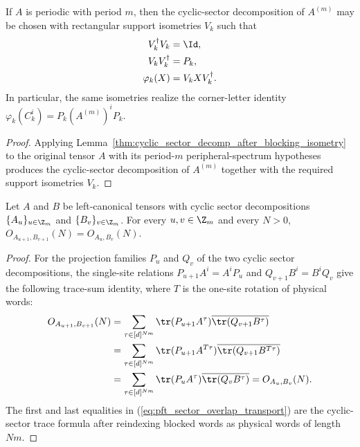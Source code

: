 \begin{lemma}
    \label{thm:cyclic_sector_compression_letter_isometry_periodic}
    \leanok
    If $A$ is periodic with period $m$, then the cyclic-sector decomposition of
    $A^{(m)}$ may be chosen with rectangular support isometries $V_k$ such that
    \begin{align}
        V_k^\dagger V_k & =\Id, \notag             \\
        V_kV_k^\dagger  & =P_k, \notag             \\
        \varphi_k(X)    & =V_kXV_k^\dagger. \notag
    \end{align}
    In particular, the same isometries realize the corner-letter identity
    $\varphi_k(C_k^i)=P_k(A^{(m)})^iP_k$.
    \begin{proof}
        \leanok
        Applying Lemma~\ref{thm:cyclic_sector_decomp_after_blocking_isometry}
        to the original tensor $A$ with its period-$m$ peripheral-spectrum
        hypotheses produces the cyclic-sector decomposition of $A^{(m)}$
        together with the required support isometries $V_k$.
    \end{proof}
\end{lemma}

\begin{lemma}
    \label{lem:sector_overlap_succ_eq_cyclic_sector_decomp}
    \leanok
    Let $A$ and $B$ be left-canonical tensors with cyclic sector
    decompositions $\{A_u\}_{u\in\Z_m}$ and
    $\{B_v\}_{v\in\Z_m}$. For every $u,v\in\Z_m$ and every $N>0$,
    $O_{A_{u+1},B_{v+1}}(N)=O_{A_u,B_v}(N)$.
\end{lemma}

\begin{proof}\leanok
    For the projection families $P_u$ and $Q_v$ of the two cyclic sector
    decompositions, the single-site relations
    $P_{u+1}A^i=A^iP_u$ and $Q_{v+1}B^i=B^iQ_v$ give the following
    trace-sum identity, where $T$ is the one-site rotation of physical words:
    \begin{align}
        O_{A_{u+1},B_{v+1}}(N)
         & =\sum_{\tau\in[d]^{Nm}}\tr(P_{u+1}A^\tau)
        \overline{\tr(Q_{v+1}B^\tau)} \notag            \\
         & =\sum_{\tau\in[d]^{Nm}}\tr(P_{u+1}A^{T\tau})
        \overline{\tr(Q_{v+1}B^{T\tau})} \notag         \\
         & =\sum_{\tau\in[d]^{Nm}}\tr(P_uA^\tau)
        \overline{\tr(Q_vB^\tau)}
        =O_{A_u,B_v}(N).
        \label{eq:pft_sector_overlap_transport}
    \end{align}
    The first and last equalities in
    (\ref{eq:pft_sector_overlap_transport}) are the cyclic-sector trace formula
    after reindexing blocked words as physical words of length $Nm$.
\end{proof}


